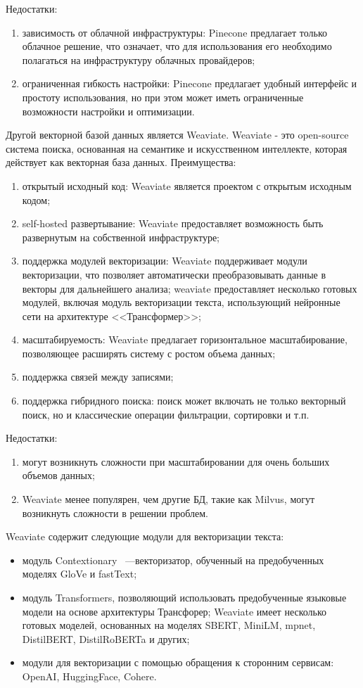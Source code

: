 Недостатки:

\begin{enumerate}
    \item зависимость от облачной инфраструктуры: Pinecone предлагает только облачное решение, что означает, что для использования его необходимо полагаться на инфраструктуру облачных провайдеров;
    \item ограниченная гибкость настройки: Pinecone предлагает удобный интерфейс и простоту использования, но при этом может иметь ограниченные возможности настройки и оптимизации.
\end{enumerate}

Другой векторной базой данных является Weaviate. Weaviate - это open-source система поиска, основанная на семантике и искусственном интеллекте, которая действует как векторная база данных. Преимущества:
\begin{enumerate}
    \item открытый исходный код: Weaviate является проектом с открытым исходным кодом;
    \item self-hosted развертывание: Weaviate предоставляет возможность быть развернутым на собственной инфраструктуре;
    \item поддержка модулей векторизации: Weaviate поддерживает модули векторизации, что позволяет автоматически преобразовывать данные в векторы для дальнейшего анализа; weaviate предоставляет несколько готовых модулей, включая модуль векторизации текста, использующий нейронные сети на архитектуре <<Трансформер>>;
    \item масштабируемость: Weaviate предлагает горизонтальное масштабирование, позволяющее расширять систему с ростом объема данных;
    \item поддержка связей между записями;
    \item поддержка гибридного поиска: поиск может включать не только векторный поиск, но и классические операции фильтрации, сортировки и т.п.
\end{enumerate}

Недостатки:
\begin{enumerate}
    \item могут возникнуть сложности при масштабировании для очень больших объемов данных;
    \item Weaviate менее популярен, чем другие БД, такие как Milvus, могут возникнуть сложности в решении проблем.
\end{enumerate}

Weaviate содержит следующие модули для векторизации текста:
\begin{itemize}
    \item модуль Contextionary ~---векторизатор, обученный на предобученных моделях GloVe и fastText;
    \item модуль Transformers, позволяющий использовать предобученные языковые модели на основе архитектуры Трансфорер; Weaviate имеет несколько готовых моделей, основанных на моделях SBERT, MiniLM, mpnet, DistilBERT, DistilRoBERTa и других;
    \item модули для векторизации с помощью обращения к сторонним сервисам: OpenAI, HuggingFace, Cohere.
\end{itemize}

